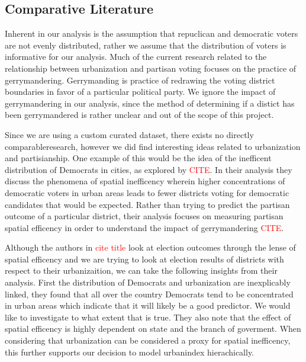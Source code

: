 \documentclass[12pt]{article}
\newcommand{\red}[1]{\textcolor{red}{#1}}
\begin{document}
\subsection*{Comparative Literature}
Inherent in our analysis is the assumption that repuclican and democratic voters are not evenly distributed, rather we assume that the distribution of voters is informative for our analysis. Much of the current research related to the relationship between urbanization and partisan voting focuses on the practice of gerrymandering. Gerrymanding is practice of redrawing the voting district boundaries in favor of a particular political party. We ignore the impact of gerrymandering in our analysis, since the method of determining if a distict has been gerrymandered is rather unclear and out of the scope of this project.

Since we are using a custom curated dataset, there exists no directly comparableresearch, however we did find interesting ideas related to urbanization and partisianship. One example of this would be the idea of the inefficent distribution of Democrats in cities, as explored by \textcolor{red}{CITE}. In their analysis they discuss the phenomena of spatial inefficency wherein higher concentrations of democratic voters in urban areas leads to fewer districts voting for democratic candidates that would be expected. Rather than trying to predict the partisan outcome of a particular district, their analysis focuses on measuring partisan spatial efficency in order to understand the impact of gerrymandering \red{CITE}. 

Although the authors in \red{cite title} look at election outcomes through the lense of spatial efficency and we are trying to look at election results of districts with respect to their urbanizaition, we can take the following insights from their analysis. First the distribution of Democrats and urbanization are inexplicably linked, they found that all over the country Democrats tend to be concentrated in urban areas which indicate that it will likely be a good predictor. We would like to investigate to what extent that is true. They also note that the effect of spatial efficency is highly dependent on state and the branch of goverment. When considering that urbanization can be considered a proxy for spatial inefficency, this further supports our decision to model urbanindex hierachically. 




\end{document}
